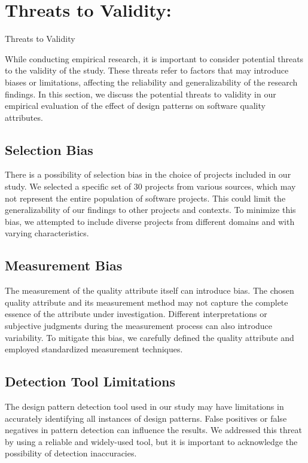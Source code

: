 \documentclass[conference]{IEEEtran}
\begin{document}
	\section{Threats to Validity:}
	Threats to Validity
	
	While conducting empirical research, it is important to consider potential threats to the validity of the study. These threats refer to factors that may introduce biases or limitations, affecting the reliability and generalizability of the research findings. In this section, we discuss the potential threats to validity in our empirical evaluation of the effect of design patterns on software quality attributes.
	
	\subsection{Selection Bias}
	 There is a possibility of selection bias in the choice of projects included in our study. We selected a specific set of 30 projects from various sources, which may not represent the entire population of software projects. This could limit the generalizability of our findings to other projects and contexts. To minimize this bias, we attempted to include diverse projects from different domains and with varying characteristics.
	
	\subsection{Measurement Bias}
	 The measurement of the quality attribute itself can introduce bias. The chosen quality attribute and its measurement method may not capture the complete essence of the attribute under investigation. Different interpretations or subjective judgments during the measurement process can also introduce variability. To mitigate this bias, we carefully defined the quality attribute and employed standardized measurement techniques.
	
	\subsection{Detection Tool Limitations} 
	The design pattern detection tool used in our study may have limitations in accurately identifying all instances of design patterns. False positives or false negatives in pattern detection can influence the results. We addressed this threat by using a reliable and widely-used tool, but it is important to acknowledge the possibility of detection inaccuracies.
	
\end{document}
